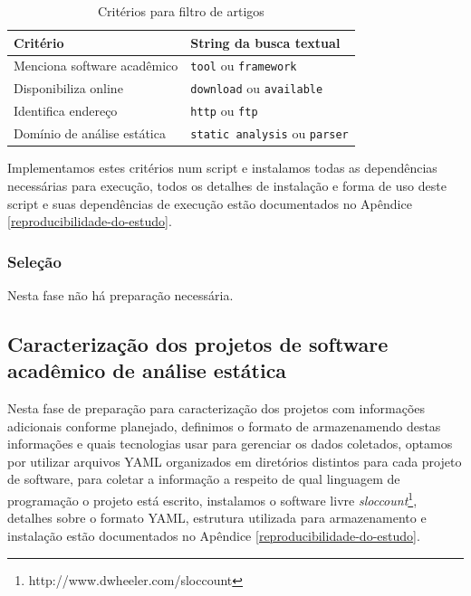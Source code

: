\begin{table}[h]
\caption{Critérios para filtro de artigos}
\centering
\begin{tabular}{ l l }
  \hline
  Critério                        & String da busca textual               \\
  \hline
  Menciona software acadêmico     & {\tt tool} ou {\tt framework}         \\
  Disponibiliza online            & {\tt download} ou {\tt available}     \\
  Identifica endereço             & {\tt http} ou {\tt ftp}               \\
  Domínio de análise estática     & {\tt static analysis} ou {\tt parser} \\
  \hline
\end{tabular}
\label{criterios-filtro}
\end{table}

Implementamos estes critérios num script e instalamos todas as dependências
necessárias para execução, todos os detalhes de instalação e forma de uso deste
script e suas dependências de execução estão documentados no Apêndice
\ref{reproducibilidade-do-estudo}.

\subsubsection{Seleção}

Nesta fase não há preparação necessária.


\subsection{Caracterização dos projetos de software acadêmico de análise estática} %

Nesta fase de preparação para caracterização dos projetos com informações
adicionais conforme planejado, definimos o formato de armazenamendo destas
informações e quais tecnologias usar para gerenciar os dados coletados, optamos
por utilizar arquivos YAML organizados em diretórios distintos para cada
projeto de software, para coletar a informação a respeito de qual linguagem de
programação o projeto está escrito, instalamos o software livre {\it
sloccount}\footnote{http://www.dwheeler.com/sloccount}, detalhes sobre o
formato YAML, estrutura utilizada para armazenamento e instalação estão
documentados no Apêndice \ref{reproducibilidade-do-estudo}.

